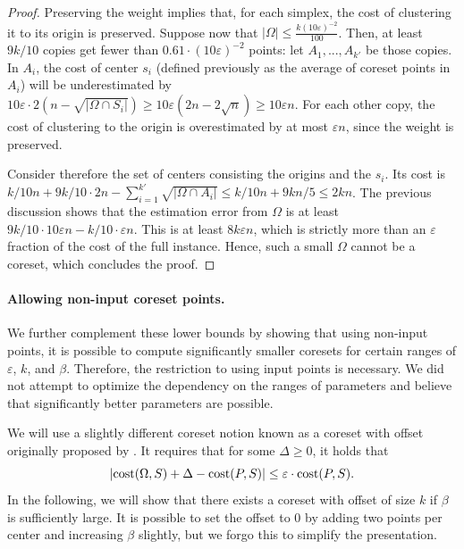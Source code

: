 \documentclass[11pt]{article}
\theoremstyle{restate}
\theoremstyle{definition}
\newcommand{\eps}{\ensuremath{\varepsilon}}
\newcommand{\cost}{\textnormal{cost}}
\begin{document}
\begin{proof}
Preserving the weight implies that, for each simplex, the cost of clustering it to its origin is preserved. Suppose now that $|\Omega| \leq \frac{k(10\eps)^{-2}}{100}$. Then, at least $9k/10$ copies get fewer than $0.61\cdot (10\eps)^{-2}$ points: let $A_1, ..., A_{k'}$ be those copies. In $A_i$, the cost of center $s_i$ (defined previously as the average of coreset points in $A_i$) will be underestimated by $10 \eps \cdot 2(n-\sqrt{|\Omega \cap S_i|}) \geq 10\eps (2n-2\sqrt{n}) \geq 10\eps n$. For each other copy, the cost of clustering to the origin is overestimated by at most $\eps n$, since the weight is preserved. 


Consider therefore the set of centers consisting the origins and the $s_i$. Its cost is $k/10 n + 9k/10 \cdot 2n- \sum_{i=1}^{k'}\sqrt{|\Omega \cap A_i|} \leq k/10 n + 9kn/5 \leq 2k n$. 
The previous discussion shows that the estimation error from $\Omega$ is at least $9k/10 \cdot 10\eps n - k/10 \cdot \eps n$. This is at least $8k \eps n $, which is strictly more than an $\eps$ fraction of the cost of the full instance. Hence, such a small $\Omega$ cannot be a coreset, which concludes the proof.
\end{proof}

\paragraph{Allowing non-input coreset points.} We further complement these lower bounds by showing that using non-input points, it is possible to compute significantly smaller coresets for certain ranges of $\varepsilon$, $k$, and $\beta$. Therefore, the restriction to using input points is necessary. We did not attempt to optimize the dependency on the ranges of parameters and believe that significantly better parameters are possible.

We will use a slightly different coreset notion known as a coreset with offset originally proposed by \cite{FeldmanSS20}. It requires that for some $\Delta\geq 0$, it holds that 
\[\left\vert \cost(\Omega,S) + \Delta - \cost(P,S)\right\vert \leq \varepsilon\cdot \cost(P,S).\]
In the following, we will show that there exists a coreset with offset of size $k$ if $\beta$ is sufficiently large.
It is possible to set the offset to $0$ by adding two points per center and increasing $\beta$ slightly, but we forgo this to simplify the presentation.
\end{document}
